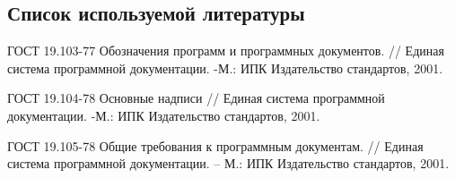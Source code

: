\subsection*{Список используемой литературы}
\begin{my_enumerate}

\item
ГОСТ 19.103-77 Обозначения программ и программных документов. // Единая система программной документации. -М.: ИПК Издательство стандартов, 2001. \\

\item
ГОСТ 19.104-78 Основные надписи // Единая система программной документации. -М.: ИПК Издательство стандартов, 2001. \\

\item
ГОСТ 19.105-78 Общие требования к программным документам. // Единая система
программной документации. – М.: ИПК Издательство стандартов, 2001. \\


\end{my_enumerate}

